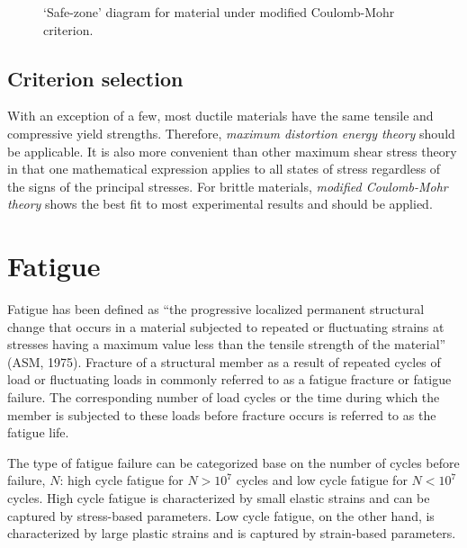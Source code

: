\documentclass[a4paper,openany,12pt]{book}
\begin{document}
\begin{figure}[h]
  \centering
  \caption{`Safe-zone' diagram for material under modified Coulomb-Mohr criterion.}
  \label{fig: MCM safe zone}
\end{figure}

\subsection{Criterion selection}
\label{criterion-selection}
With an exception of a few, most ductile materials have the same tensile
and compressive yield strengths. Therefore, \emph{maximum distortion energy
theory} should be applicable. It is also more convenient than other
maximum shear stress theory in that one mathematical expression applies
to all states of stress regardless of the signs of the principal
stresses. For brittle materials, \emph{modified Coulomb-Mohr theory} shows
the best fit to most experimental results and should be applied.

\section{Fatigue}
\label{fatigue}
Fatigue has been defined as ``the progressive localized permanent
structural change that occurs in a material subjected to repeated or
fluctuating strains at stresses having a maximum value less than the
tensile strength of the material'' (ASM, 1975). Fracture of a structural
member as a result of repeated cycles of load or fluctuating loads in
commonly referred to as a fatigue fracture or fatigue failure. The
corresponding number of load cycles or the time during which the member
is subjected to these loads before fracture occurs is referred to as the
fatigue life.

The type of fatigue failure can be categorized base on the number of
cycles before failure, \(N\): high cycle fatigue for \(N > 10^7\) cycles and
low cycle fatigue for \(N < 10^7\) cycles. High cycle fatigue is
characterized by small elastic strains and can be captured by
stress-based parameters. Low cycle fatigue, on the other hand, is
characterized by large plastic strains and is captured by strain-based
parameters.
\end{document}
